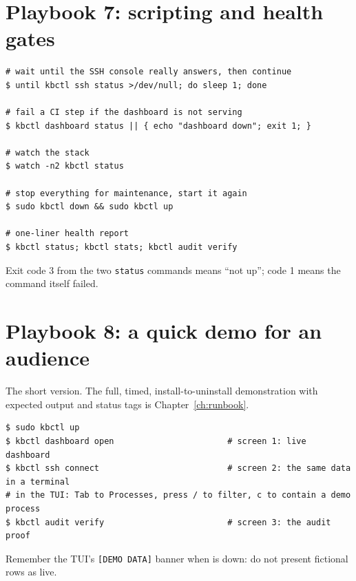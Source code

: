 \section{Playbook 7: scripting and health gates}
\begin{lstlisting}[style=console]
# wait until the SSH console really answers, then continue
$ until kbctl ssh status >/dev/null; do sleep 1; done

# fail a CI step if the dashboard is not serving
$ kbctl dashboard status || { echo "dashboard down"; exit 1; }

# watch the stack
$ watch -n2 kbctl status

# stop everything for maintenance, start it again
$ sudo kbctl down && sudo kbctl up

# one-liner health report
$ kbctl status; kbctl stats; kbctl audit verify
\end{lstlisting}
Exit code 3 from the two \texttt{status} commands means ``not up''; code 1 means the command itself failed.

\section{Playbook 8: a quick demo for an audience}
The short version. The full, timed, install-to-uninstall demonstration with expected output and status tags is Chapter~\ref{ch:runbook}.
\begin{lstlisting}[style=console]
$ sudo kbctl up
$ kbctl dashboard open                       # screen 1: live dashboard
$ kbctl ssh connect                          # screen 2: the same data in a terminal
# in the TUI: Tab to Processes, press / to filter, c to contain a demo process
$ kbctl audit verify                         # screen 3: the audit proof
\end{lstlisting}
Remember the TUI's \texttt{[DEMO DATA]} banner when  is down: do not present fictional rows as live.

